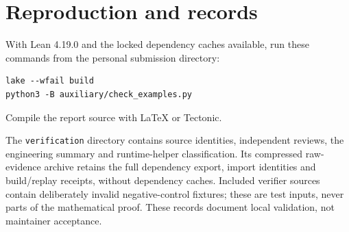\documentclass[11pt]{article}
\begin{document}
\section{Reproduction and records}
With Lean 4.19.0 and the locked dependency caches available, run these commands
from the personal submission directory:
\begin{verbatim}
lake --wfail build
python3 -B auxiliary/check_examples.py
\end{verbatim}
Compile the report source with LaTeX or Tectonic.

The \texttt{verification} directory contains source identities, independent
reviews, the engineering summary and runtime-helper classification. Its
compressed raw-evidence archive retains the full dependency export, import
identities and build/replay receipts, without dependency caches. Included
verifier sources contain deliberately invalid negative-control fixtures;
these are test inputs, never parts of the mathematical proof. These records
document local validation, not maintainer acceptance.
\end{document}
